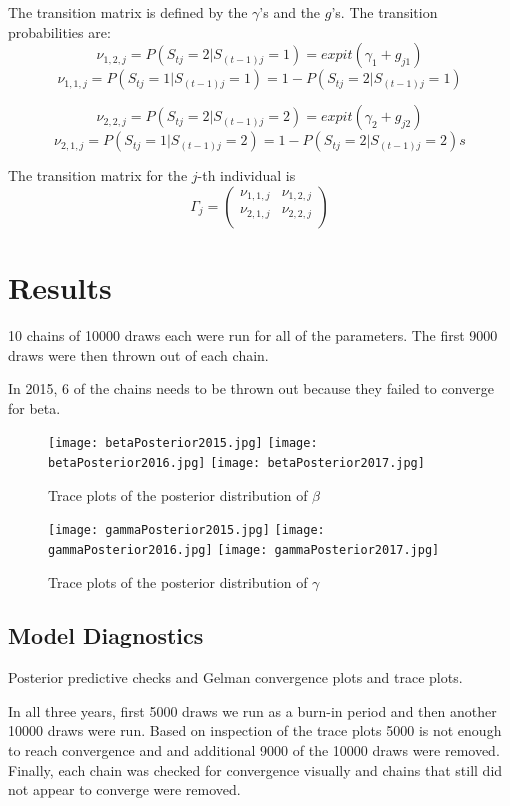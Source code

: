 \documentclass[letterpaper,12pt]{article}\usepackage[]{graphicx}\usepackage[]{color}
\begin{document}
The transition matrix is defined by the $\gamma$'s and the $g$'s.  
The transition probabilities are: 
 $$\nu_{1,2,j} = P(S_{tj}=2 | S_{(t-1)j}=1) = expit(\gamma_1 + g_{j1})$$
  $$\nu_{1,1,j} =  P(S_{tj}=1 | S_{(t-1)j}=1) = 1-P(S_{tj}=2 | S_{(t-1)j}=1)$$

 $$\nu_{2,2,j} =  P(S_{tj}=2 | S_{(t-1)j}=2) = expit(\gamma_2 + g_{j2})$$
  $$\nu_{2,1,j} = P(S_{tj}=1 | S_{(t-1)j}=2) = 1-P(S_{tj}=2 | S_{(t-1)j}=2)s
  $$
  
  The transition matrix for the $j$-th individual is 
  $$
  \Gamma_j = \left(\begin{array}{cc}
\nu_{1,1,j} & \nu_{1,2,j} \\
\nu_{2,1,j} & \nu_{2,2,j}\\
\end{array}\right)
  $$



\section{Results}
10 chains of 10000 draws each were run for all of the parameters.  The first 9000 draws were then thrown out of each chain.  

In 2015, 6 of the chains needs to be thrown out because they failed to converge for beta.  

\begin{figure}[ht]
\texttt{[image: betaPosterior2015.jpg]}
\texttt{[image: betaPosterior2016.jpg]}
\texttt{[image: betaPosterior2017.jpg]}
	  \caption{Trace plots of the posterior distribution of $\beta$}
  \label{betaPosterior}
\end{figure}


\begin{figure}[ht]
\texttt{[image: gammaPosterior2015.jpg]}
\texttt{[image: gammaPosterior2016.jpg]}
\texttt{[image: gammaPosterior2017.jpg]}
	  \caption{Trace plots of the posterior distribution of $\gamma$}
  \label{betaPosterior}
\end{figure}






\subsection{Model Diagnostics}
Posterior predictive checks and Gelman convergence plots and trace plots.  


In all three years, first 5000 draws we run as a burn-in period and then another 10000 draws were run.  Based on inspection of the trace plots 5000 is not enough to reach convergence and and additional 9000 of the 10000 draws were removed.  Finally, each chain was checked for convergence visually and chains that still did not appear to converge were removed. 
\end{document}
